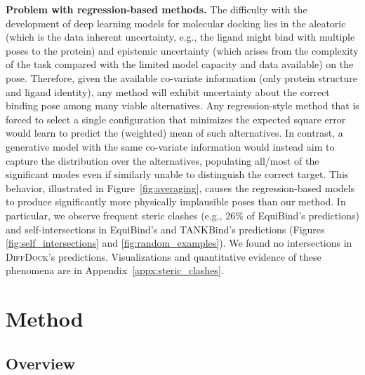 \documentclass{article} \usepackage{iclr2023_conference,times}
\newcommand{\new}[1]{#1}
\begin{document}
\textbf{Problem with regression-based methods.} The difficulty with the development of deep learning models for molecular docking lies in the \new{aleatoric (which is the data inherent uncertainty, e.g., the ligand might bind with multiple poses to the protein) and epistemic uncertainty (which arises from the complexity of the task compared with the limited model capacity and data available) on the pose}. Therefore, given the available co-variate information (only protein structure and ligand identity), any method will exhibit uncertainty about the correct binding pose among many viable alternatives. Any regression-style method that is forced to select a single configuration that minimizes the expected square error would learn to predict the (weighted) mean of such alternatives. In contrast, a generative model with the same co-variate information would instead aim to capture the distribution over the alternatives, populating all/most of the significant modes even if similarly unable to distinguish the correct target. This behavior, illustrated in Figure~\ref{fig:averaging}, causes the regression-based models to produce significantly more physically implausible poses than our method. In particular, we observe frequent steric clashes (e.g., 26\% of EquiBind's predictions) and self-intersections in EquiBind's and TANKBind's predictions (Figures \ref{fig:self_intersections} and \ref{fig:random_examples}). We found no intersections in \textsc{DiffDock}'s predictions. 
Visualizations and quantitative evidence of these phenomena are in Appendix~\ref{appx:steric_clashes}.


\section{Method} \label{sec:diffusion_model}

\subsection{Overview}
\end{document}
